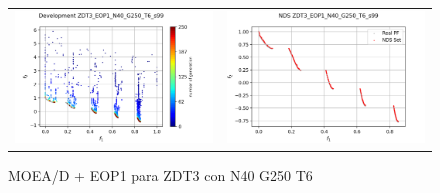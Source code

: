 \begin{figure}[H]
\begin{tabular}{c c}
    \includegraphics[scale=0.5]{figures/ZDT3_EOP1_N40_G250_T6/s99_dev.png} &
    \includegraphics[scale=0.5]{figures/ZDT3_EOP1_N40_G250_T6/s99_nds.png}\\
    \end{tabular}
    \caption{MOEA/D + EOP1 para ZDT3 con N40 G250 T6 }
    \label{fig:4}
\end{figure}


